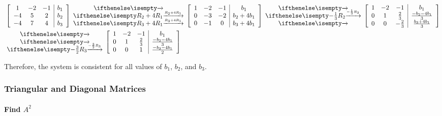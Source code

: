 \documentclass[
  letterpaper,
  DIV=11,
  numbers=noendperiod]{scrartcl}
\let\oldparagraph\paragraph
\renewcommand{\paragraph}[1]{\oldparagraph{#1}\mbox{}}
\begin{document}
\begin{align*}
&\left[\begin{array}{ccc|c}1 & -2 & -1 & b_1 \\ -4 & 5 & 2 & b_2 \\ -4 & 7 & 4 & b_3 \end{array}\right] \rowops{,R_2+4R_1,R_3+4R_1}\left[\begin{array}{ccc|c}1 & -2 & -1 & b_1 \\ 0 & -3 & -2 & b_2+4b_1 \\ 0 & -1 & 0 & b_3+4b_1\end{array}\right] \rowops{,-\frac{1}{3}R_2,}\left[\begin{array}{ccc|c}1 & -2 & -1 & b_1 \\ 0 & 1 & \frac{2}{3} & \frac{-b_2-4b_1}{3} \\ 0 & 0 & -\frac{2}{3} & \frac{b_3+4b_1}{3}\end{array}\right]\\
&\rowops{,,-\frac{3}{2}R_3}\left[\begin{array}{ccc|c}1 & -2 & -1 & b_1 \\ 0 & 1 & \frac{2}{3} & \frac{-b_2-4b_1}{3} \\ 0 & 0 & 1 & \frac{-b_3-4b_1}{2}\end{array}\right]
\end{align*}

Therefore, the system is consistent for all values of \(b_1\), \(b_2\),
and \(b_3\).

\newpage{}

\hypertarget{triangular-and-diagonal-matrices}{%
\subsubsection{Triangular and Diagonal
Matrices}\label{triangular-and-diagonal-matrices}}

\hypertarget{find-a2}{%
\paragraph{\texorpdfstring{Find \(A^2\)}{Find A\^{}2}}\label{find-a2}}
\end{document}
